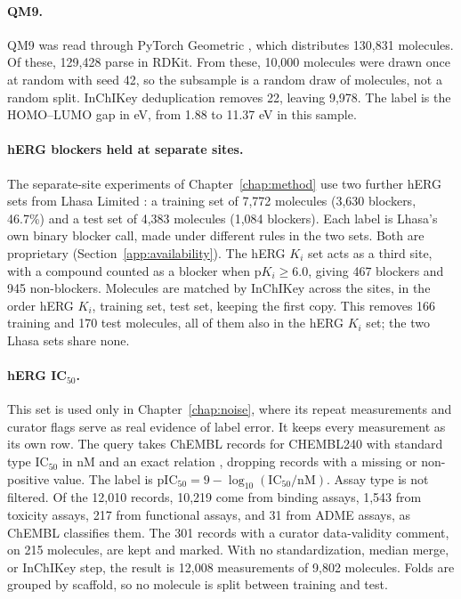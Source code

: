 \paragraph{QM9.} QM9 \citep{Ramakrishnan2014, qm9_dataset} was read through PyTorch Geometric \citep{pytorchGeometric}, which distributes 130,831 molecules. Of these, 129,428 parse in RDKit. From these, 10,000 molecules were drawn once at random with seed 42, so the subsample is a random draw of molecules, not a random split. InChIKey deduplication removes 22, leaving 9,978. The label is the HOMO--LUMO gap in eV, from 1.88 to 11.37 eV in this sample.

\paragraph{hERG blockers held at separate sites.} The separate-site experiments of Chapter~\ref{chap:method} use two further hERG sets from Lhasa Limited \citep{Bassani2023, Hanser2023}: a training set of 7,772 molecules (3,630 blockers, 46.7\%) and a test set of 4,383 molecules (1,084 blockers). Each label is Lhasa's own binary blocker call, made under different rules in the two sets. Both are proprietary (Section~\ref{app:availability}). The hERG $K_i$ set acts as a third site, with a compound counted as a blocker when $\mathrm{p}K_i \ge 6.0$, giving 467 blockers and 945 non-blockers. Molecules are matched by InChIKey across the sites, in the order hERG $K_i$, training set, test set, keeping the first copy. This removes 166 training and 170 test molecules, all of them also in the hERG $K_i$ set; the two Lhasa sets share none.

\paragraph{\texorpdfstring{hERG IC$_{50}$.}{hERG IC50.}} This set is used only in Chapter~\ref{chap:noise}, where its repeat measurements and curator flags serve as real evidence of label error. It keeps every measurement as its own row. The query takes ChEMBL records for CHEMBL240 with standard type IC$_{50}$ in nM and an exact relation \citep{Zdrazil2023}, dropping records with a missing or non-positive value. The label is $\mathrm{pIC_{50}} = 9 - \log_{10}(\mathrm{IC_{50}}/\mathrm{nM})$. Assay type is not filtered. Of the 12,010 records, 10,219 come from binding assays, 1,543 from toxicity assays, 217 from functional assays, and 31 from ADME assays, as ChEMBL classifies them. The 301 records with a curator data-validity comment, on 215 molecules, are kept and marked. With no standardization, median merge, or InChIKey step, the result is 12,008 measurements of 9,802 molecules. Folds are grouped by scaffold, so no molecule is split between training and test.

